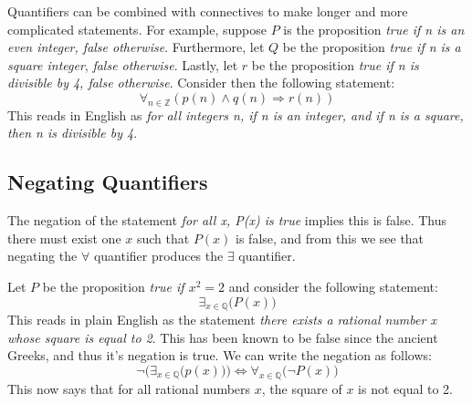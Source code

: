     \begin{example}
        Quantifiers can be combined with connectives to make longer and more
        complicated statements. For example, suppose $P$ is the proposition
        \textit{true if n is an even integer, false otherwise}. Furthermore,
        let $Q$ be the proposition \textit{true if n is a square integer},
        \textit{false otherwise}. Lastly, let $r$ be the proposition
        \textit{true if n is divisible by 4, false otherwise}.
        Consider then the following statement:
        \begin{equation}
            \forall_{n\in\mathbb{Z}}(p(n)\land{q(n)}\Rightarrow{r}(n))
        \end{equation}
        This reads in English as \textit{for all integers n, if n is an}
        \textit{integer, and if n is a square, then n is divisible by 4}.
    \end{example}
    \subsection{Negating Quantifiers}
        The negation of the statement \textit{for all x, P(x) is true} implies
        this is false. Thus there must exist one $x$ such that $P(x)$ is false,
        and from this we see that negating the $\forall$ quantifier produces the
        $\exists$ quantifier.
        \begin{example}
            Let $P$ be the proposition \textit{true if $x^{2}=2$} and consider
            the following statement:
            \begin{equation}
                \exists_{x\in\mathbb{Q}}\big(P(x)\big)
            \end{equation}
            This reads in plain English as the statement \textit{there exists a}
            \textit{rational number x whose square is equal to 2}. This has been
            known to be false since the ancient Greeks, and thus it's negation
            is true. We can write the negation as follows:
            \begin{equation}
                \neg\Big(\exists_{x\in\mathbb{Q}}\big(p(x)\big)\Big)
                \Longleftrightarrow\forall_{x\in\mathbb{Q}}\big(\neg{P}(x)\big)
            \end{equation}
            This now says that for all rational numbers $x$, the square of $x$
            is not equal to 2.
        \end{example}